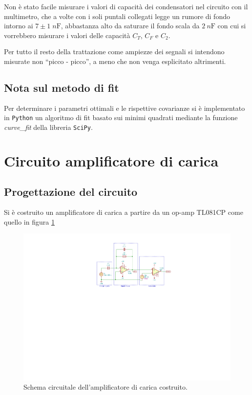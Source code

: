 \documentclass[10pt,a4paper]{article}
\begin{document}
Non è stato facile misurare i valori di capacità dei condensatori nel
circuito con il multimetro, che a volte con i soli puntali collegati legge
un rumore di fondo intorno ai $7 \pm 1 \; \si{n\F}$, abbastanza alto da
saturare il fondo scala da $\SI{2}{n\F}$ con cui si vorrebbero misurare i
valori delle capacità $C_T$, $C_F$ e $C_2$.

Per tutto il resto della trattazione come ampiezze dei segnali si intendono
misurate non ``picco - picco'', a meno che non venga esplicitato altrimenti.

\subsection*{Nota sul metodo di fit}
Per determinare i parametri ottimali e le rispettive covarianze si \`e
implementato in \verb+Python+ un algoritmo di fit basato sui minimi quadrati
mediante la funzione \emph{curve\_fit} della libreria \texttt{SciPy}.

\section{Circuito amplificatore di carica}
\subsection{Progettazione del circuito}
Si è costruito un amplificatore di carica a partire da un op-amp TL081CP come
quello in figura \ref{fig: Qampschm}

\begin{figure}[htbp]
    \centering
	\includegraphics[scale=1.2]{Qamp}
    \caption{Schema circuitale dell'amplificatore di carica costruito.
    \label{fig: Qampschm}}
\end{figure}
\end{document}
